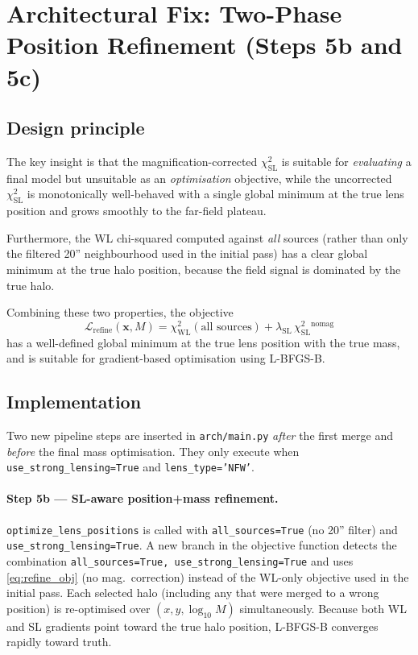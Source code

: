 \documentclass[12pt]{article}
\begin{document}
\section{Architectural Fix: Two-Phase Position Refinement (Steps 5b and 5c)}
\label{sec:arch}

\subsection{Design principle}

The key insight is that the magnification-corrected $\chi^2_\mathrm{SL}$ is suitable for
\emph{evaluating} a final model but unsuitable as an \emph{optimisation} objective, while
the uncorrected $\chi^2_\mathrm{SL}$ is monotonically well-behaved with a single global
minimum at the true lens position and grows smoothly to the far-field plateau.

Furthermore, the WL chi-squared computed against \emph{all} sources (rather than only the
filtered 20'' neighbourhood used in the initial pass) has a clear global minimum at the
true halo position, because the field signal is dominated by the true halo.

Combining these two properties, the objective
\begin{equation}
  \mathcal{L}_\mathrm{refine}(\boldsymbol{x}, M)
  = \chi^2_\mathrm{WL}(\text{all sources}) + \lambda_\mathrm{SL}\,\chi^2_\mathrm{SL}^\mathrm{nomag}
  \label{eq:refine_obj}
\end{equation}
has a well-defined global minimum at the true lens position with the true mass, and is
suitable for gradient-based optimisation using L-BFGS-B.

\subsection{Implementation}

Two new pipeline steps are inserted in \texttt{arch/main.py} \emph{after} the first merge
and \emph{before} the final mass optimisation.  They only execute when
\texttt{use\_strong\_lensing=True} and \texttt{lens\_type='NFW'}.

\paragraph{Step 5b --- SL-aware position+mass refinement.}
\texttt{optimize\_lens\_positions} is called with \texttt{all\_sources=True}
(no 20'' filter) and \texttt{use\_strong\_lensing=True}.  A new branch in the
objective function detects the combination \texttt{all\_sources=True, use\_strong\_lensing=True}
and uses \eqref{eq:refine_obj} (no mag.\ correction) instead of the WL-only objective
used in the initial pass.  Each selected halo (including any that were merged to a wrong
position) is re-optimised over $(x, y, \log_{10}M)$ simultaneously.  Because both WL and
SL gradients point toward the true halo position, L-BFGS-B converges rapidly toward truth.
\end{document}
